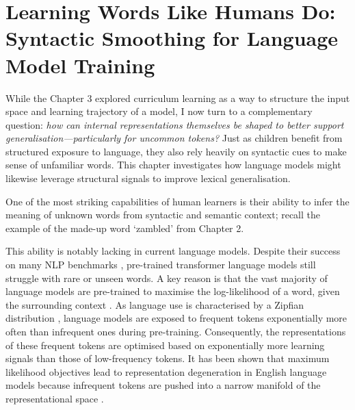 \chapter{Learning Words Like Humans Do: Syntactic Smoothing for Language Model Training}

While the Chapter 3 explored curriculum learning as a way to structure the input space and learning trajectory of a model, I now turn to a complementary question: \emph{how can internal representations themselves be shaped to better support generalisation—particularly for uncommon tokens?} Just as children benefit from structured exposure to language, they also rely heavily on syntactic cues to make sense of unfamiliar words. This chapter investigates how language models might likewise leverage structural signals to improve lexical generalisation.

One of the most striking capabilities of human learners is their ability to infer the meaning of unknown words from syntactic and semantic context; recall the example of the made-up word `zambled' from Chapter 2.


This ability is notably lacking in current language models. Despite their success on many NLP benchmarks \citep{touvron2023llama, chowdhery2023palm}, pre-trained transformer language models still struggle with rare or unseen words. A key reason is that the vast majority of language models are pre-trained to maximise the log-likelihood of a word, given the surrounding context \citep{devlin2019bert, brown2020gpt3, chowdhery2023palm, touvron2023llama}. As language use is characterised by a Zipfian distribution \citep{zipf1935zipflaw}, language models are exposed to frequent tokens exponentially more often than infrequent ones during pre-training. Consequently, the representations of these frequent tokens are optimised based on exponentially more learning signals than those of low-frequency tokens. It has been shown that maximum likelihood objectives lead to representation degeneration in English language models because infrequent tokens are pushed into a narrow manifold of the representational space \citep{gao2018representation}. 

